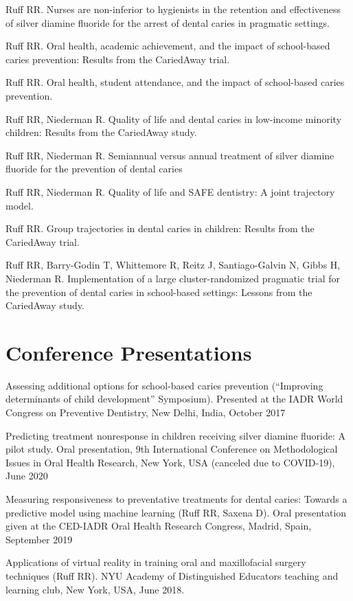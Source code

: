 \documentclass[margin,line]{res}
\begin{document}
\begin{resume}
Ruff RR. Nurses are non-inferior to hygienists in the retention and effectiveness of silver diamine fluoride for the arrest of dental caries in pragmatic settings.

Ruff RR. Oral health, academic achievement, and the impact of school-based caries prevention: Results from the CariedAway trial.

Ruff RR. Oral health, student attendance, and the impact of school-based caries prevention.

Ruff RR, Niederman R. Quality of life and dental caries in low-income minority children: Results from the CariedAway study.

Ruff RR, Niederman R. Semiannual versus annual treatment of silver diamine fluoride for the prevention of dental caries

Ruff RR, Niederman R. Quality of life and SAFE dentistry: A joint trajectory model.

Ruff RR. Group trajectories in dental caries in children: Results from the CariedAway trial.

Ruff RR, Barry-Godin T, Whittemore R, Reitz J, Santiago-Galvin N, Gibbs H, Niederman R. Implementation of a large cluster-randomized pragmatic trial for the prevention of dental caries in school-based settings: Lessons from the CariedAway study.


\section{\sc Conference Presentations}
Assessing additional options for school-based caries prevention (“Improving
determinants of child development” Symposium). Presented at the IADR World Congress on Preventive Dentistry, New Delhi, India, October 2017

Predicting treatment nonresponse in children receiving silver diamine fluoride: A pilot study. Oral presentation, 9th International Conference on Methodological Issues in Oral Health Research, New York, USA (canceled due to COVID-19), June 2020

Measuring responsiveness to preventative treatments for dental caries: Towards a predictive model using machine learning (Ruff RR, Saxena D). Oral presentation given at the CED-IADR Oral Health Research Congress, Madrid, Spain, September 2019

Applications of virtual reality in training oral and maxillofacial surgery techniques (Ruff RR). NYU Academy of Distinguished Educators teaching and learning club, New York, USA, June 2018.


\end{resume}
\end{document}
